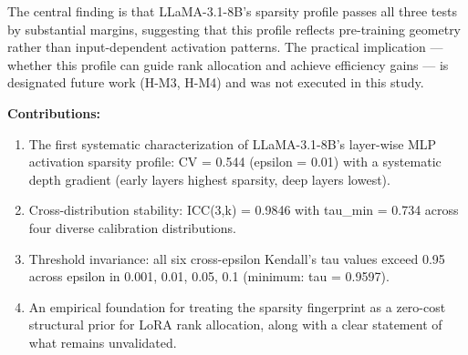 The central finding is that LLaMA-3.1-8B's sparsity profile passes all three tests by substantial margins, suggesting that this profile reflects pre-training geometry rather than input-dependent activation patterns. The practical implication --- whether this profile can guide rank allocation and achieve efficiency gains --- is designated future work (H-M3, H-M4) and was not executed in this study.

\textbf{Contributions:}

\begin{enumerate}
\item The first systematic characterization of LLaMA-3.1-8B's layer-wise MLP activation sparsity profile: CV = 0.544 (epsilon = 0.01) with a systematic depth gradient (early layers highest sparsity, deep layers lowest).
\item Cross-distribution stability: ICC(3,k) = 0.9846 with tau\_min = 0.734 across four diverse calibration distributions.
\item Threshold invariance: all six cross-epsilon Kendall's tau values exceed 0.95 across epsilon in {0.001, 0.01, 0.05, 0.1} (minimum: tau = 0.9597).
\item An empirical foundation for treating the sparsity fingerprint as a zero-cost structural prior for LoRA rank allocation, along with a clear statement of what remains unvalidated.
\end{enumerate}

